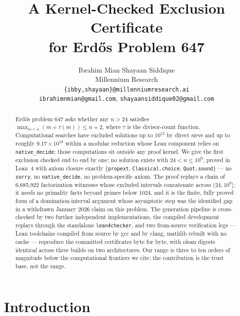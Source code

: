 \documentclass[11pt]{article}
\title{A Kernel-Checked Exclusion Certificate\\ for Erd\H{o}s Problem 647}
\author{Ibrahim Mian \qquad Shayaan Siddique\\[2pt]
\normalsize Millennium Research\\[2pt]
\normalsize \texttt{\{ibby,shayaan\}@millenniumresearch.ai}\\
\normalsize \texttt{ibrahimnmian@gmail.com}, \texttt{shayaansiddique02@gmail.com}}
\date{}
\newcommand{\tdiv}{\tau}
\newcommand{\lean}[1]{\texttt{#1}}
\begin{document}
\maketitle

\begin{abstract}
Erd\H{o}s problem 647 asks whether any $n > 24$ satisfies
$\max_{m<n}(m + \tdiv(m)) \le n + 2$, where $\tdiv$ is the divisor-count
function. Computational searches have excluded solutions up to $10^{12}$
by direct sieve and up to roughly $9.17 \times 10^{18}$ within a modular
reduction whose Lean component relies on \lean{native\_decide}; those
computations sit outside any proof kernel. We give the first exclusion
checked end to end by one: no solution exists with $24 < n \le 10^9$,
proved in Lean~4 with axiom closure exactly \{\lean{propext},
\lean{Classical.choice}, \lean{Quot.sound}\} --- no \lean{sorry}, no
\lean{native\_decide}, no problem-specific axiom. The proof replays a
chain of 6{,}685{,}922 factorization witnesses whose excluded intervals
concatenate across $(24, 10^9]$; it needs no primality facts beyond
primes below $1024$, and it is the finite, fully proved form of a
domination-interval argument whose asymptotic step was the identified
gap in a withdrawn January 2026 claim on this problem. The generation
pipeline is cross-checked by two further independent implementations,
the compiled development replays through the standalone
\lean{lean4checker}, and two from-source verification legs --- Lean
toolchains compiled from source by gcc and by clang, mathlib rebuilt
with no cache --- reproduce the committed certificates byte for byte,
with olean digests identical across three builds on two architectures.
Our range is three to ten orders of magnitude below the computational
frontiers we cite; the contribution is the trust base, not the range.
\end{abstract}

\section{Introduction}\label{sec:intro}
\end{document}
